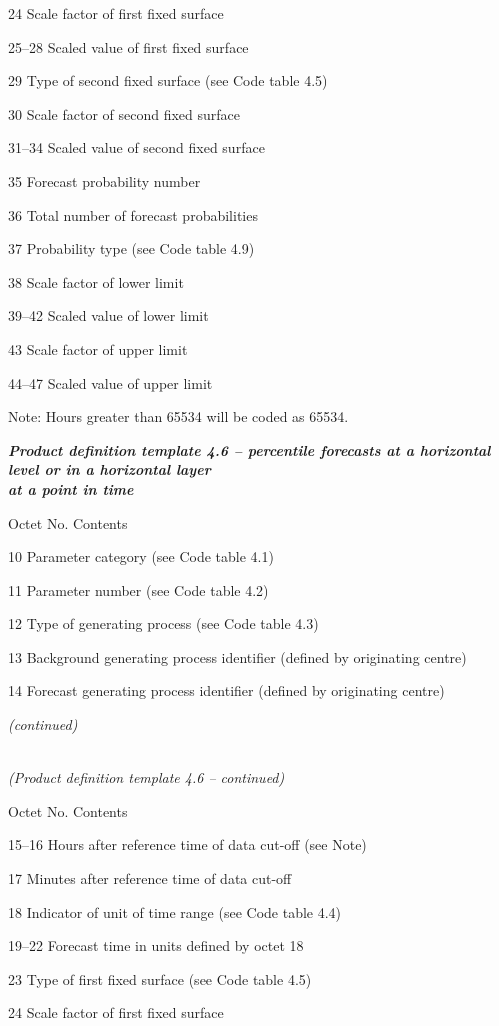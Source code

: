 24 Scale factor of first fixed surface

25--28 Scaled value of first fixed surface

29 Type of second fixed surface (see Code table 4.5)

30 Scale factor of second fixed surface

31--34 Scaled value of second fixed surface

35 Forecast probability number

36 Total number of forecast probabilities

37 Probability type (see Code table 4.9)

38 Scale factor of lower limit

39--42 Scaled value of lower limit

43 Scale factor of upper limit

44--47 Scaled value of upper limit

Note: Hours greater than 65534 will be coded as 65534.

\emph{\textbf{Product definition template 4.6 -- percentile forecasts at a horizontal level or in a horizontal layer\\
at a point in time}}

Octet No. Contents

10 Parameter category (see Code table 4.1)

11 Parameter number (see Code table 4.2)

12 Type of generating process (see Code table 4.3)

13 Background generating process identifier (defined by originating centre)

14 Forecast generating process identifier (defined by originating centre)

\emph{(continued)}

\emph{\\
(Product definition template 4.6 -- continued)}

Octet No. Contents

15--16 Hours after reference time of data cut-off (see Note)

17 Minutes after reference time of data cut-off

18 Indicator of unit of time range (see Code table 4.4)

19--22 Forecast time in units defined by octet 18

23 Type of first fixed surface (see Code table 4.5)

24 Scale factor of first fixed surface

